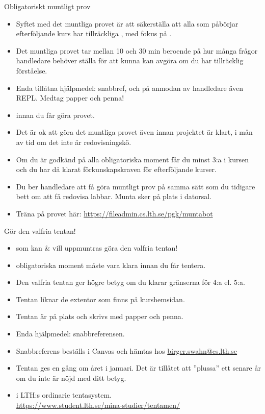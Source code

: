\begin{SlideExtra}{Obligatoriskt muntligt prov}
\begin{itemize}\SlideFontSmall
  \item Syftet med det muntliga provet är att säkerställa att alla som påbörjar efterföljande kurs har tillräckliga , med fokus på .
  \item Det muntliga provet tar mellan 10 och 30 min beroende på hur många frågor handledare behöver ställa för att kunna kan avgöra om du har tillräcklig förståelse.
  \item Enda tillåtna hjälpmedel: snabbref, och på anmodan av handledare även REPL. Medtag papper och penna!
  \item {} innan du får göra  provet.
  \item Det är ok att göra det muntliga provet även innan projektet är klart, i mån av tid om  det inte är redovisningskö.
  \item Om du är godkänd på alla obligatoriska moment får du minst 3:a i kursen och du har då klarat förkunskapskraven för efterföljande kurser.
  \item Du ber handledare att få göra muntligt prov på samma sätt som du tidigare bett om att få redovisa labbar. Munta sker på plats i datorsal.
  \item Träna på provet här: \url{https://fileadmin.cs.lth.se/pgk/muntabot}
\end{itemize}  
\end{SlideExtra}

\begin{SlideExtra}{Gör den valfria tentan!}
\begin{itemize}\SlideFontSmall
  \item {} som kan \& vill uppmuntras göra den valfria tentan!
  \item {} obligatoriska moment måste vara klara innan du får tentera.
  \item Den valfria tentan ger högre betyg om du klarar gränserna för 4:a el. 5:a.
  \item Tentan liknar de extentor som finns på kurshemsidan.
  \item Tentan är på plats och skrivs med papper och penna. 
  \item Enda hjälpmedel: snabbreferensen.
  \item Snabbreferens beställs i Canvas och hämtas hos \url{birger.swahn@cs.lth.se}
  \item Tentan ges en gång om året i januari. Det är tillåtet att ''plussa'' ett senare år om du inte är nöjd med ditt betyg.
  \item {} i LTH:s ordinarie tentasystem. \\ %
  \url{https://www.student.lth.se/mina-studier/tentamen/} 
\end{itemize}
\end{SlideExtra}


